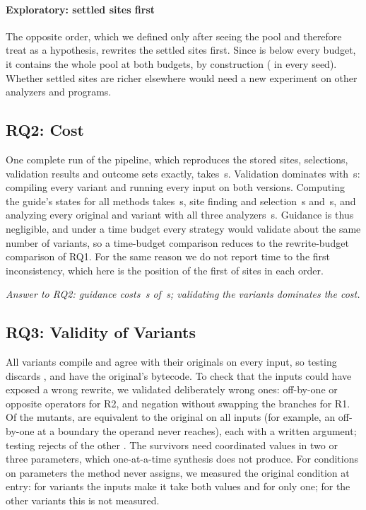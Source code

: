 \paragraph{Exploratory: settled sites first}
The opposite order, which we defined only after seeing the pool and therefore
treat as a hypothesis, rewrites the \NumSettled{} settled sites first. Since
\NumSettled{} is below every budget, it contains the whole pool at both
budgets, by construction (\MeanSettledHalf{} in every seed). Whether settled
sites are richer elsewhere would need a new experiment on other analyzers and
programs.

\subsection{RQ2: Cost}
\label{sec:rq2}
One complete run of the pipeline, which reproduces the stored sites,
selections, validation results and outcome sets exactly,
takes \CostTotal{}\,s. Validation dominates with \CostValidation{}\,s:
compiling every variant and running every input on both versions. Computing
the guide's states for all methods takes \CostExport{}\,s, site finding and
selection \CostSites{}\,s and \CostSelection{}\,s, and analyzing every
original and variant with all three analyzers \CostAnalysis{}\,s. Guidance is
thus negligible, and under a time budget every strategy would validate about
the same number of variants, so a time-budget comparison reduces to the
rewrite-budget comparison of RQ1. For the same reason we do not report time to
the first inconsistency, which here is the position of the first of
\NumInconsistentVariants{} sites in each order.

\emph{Answer to RQ2: guidance costs \CostExport{}\,s of \CostTotal{}\,s;
validating the variants dominates the cost.}

\subsection{RQ3: Validity of Variants}
\label{sec:rq3}
All \NumCompile{} variants compile and agree with their originals on every
input, so testing discards \NumDiscarded{}, and \NumBytecodeIdentical{} have
the original's bytecode. To check that the inputs could have exposed a wrong rewrite, we
validated deliberately wrong ones: off-by-one or opposite operators for R2,
and negation without swapping the branches for R1. Of the \NumMutants{}
mutants, \NumMutantsEquivalent{} are equivalent to the original on all inputs
(for example, an off-by-one at a boundary the operand never reaches), each
with a written argument; testing rejects \NumMutantsKilled{} of the other
\NumMutantsNonEquivalent{}. The \NumMutantsSurvived{} survivors need
coordinated values in two or three parameters, which one-at-a-time synthesis
does not produce. For conditions on parameters the method never assigns, we
measured the original condition at entry: for \NumCondBoth{} variants the
inputs make it take both values and for \NumCondOne{} only one; for the other
\NumCondUnknown{} variants this is not measured.

